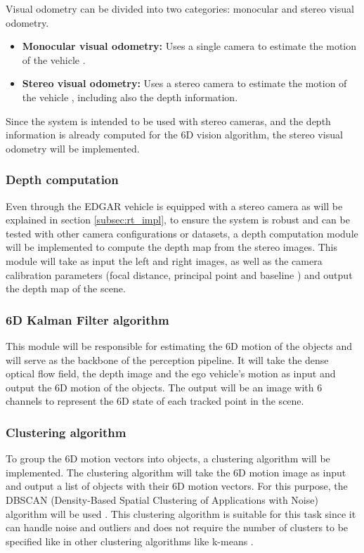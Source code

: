 Visual odometry can be divided into two categories: monocular and stereo visual odometry.

\begin{itemize}
  \item \textbf{Monocular visual odometry:} Uses a single camera to estimate the motion of the vehicle \cite{vo_mono}.
  \item \textbf{Stereo visual odometry:} Uses a stereo camera to estimate the motion of the vehicle \cite{vo_rev}, including also
  the depth information.
\end{itemize}

Since the system is intended to be used with stereo cameras, and the depth information is already computed for the 
6D vision algorithm, the stereo visual odometry will be implemented.

\subsubsection{Depth computation}

Even through the EDGAR vehicle is equipped with a stereo camera as will be explained in section \ref{subsec:rt_impl},
to ensure the system is robust and can be tested with other camera configurations or datasets, a depth computation module will be implemented
to compute the depth map from the stereo images. This module will take as input the left and right images, as well as the camera calibration
parameters (focal distance, principal point and baseline \cite{pin_hole_camera_model}) and output the depth map of the scene.

\subsubsection{6D Kalman Filter algorithm}

This module will be responsible for estimating the 6D motion of the objects and will serve as the backbone of the perception pipeline.
It will take the dense optical flow field, the depth image and the ego vehicle's motion as input and output the 6D motion of the objects. 
The output will be an image with 6 channels to represent the 6D state of each tracked point in the scene. 
\subsubsection{Clustering algorithm}

To group the 6D motion vectors into objects, a clustering algorithm \cite{clustering_concept} will be implemented. The clustering algorithm will take the 6D motion image as input and output a list of objects with their 6D motion vectors.
For this purpose, the DBSCAN (Density-Based Spatial Clustering of Applications with Noise) algorithm will be used \cite{dbscan_concept}. This clustering
algorithm is suitable for this task since it can handle noise and outliers and does not require the number of clusters to be specified like in 
other clustering algorithms like k-means \cite{kmeans}.

